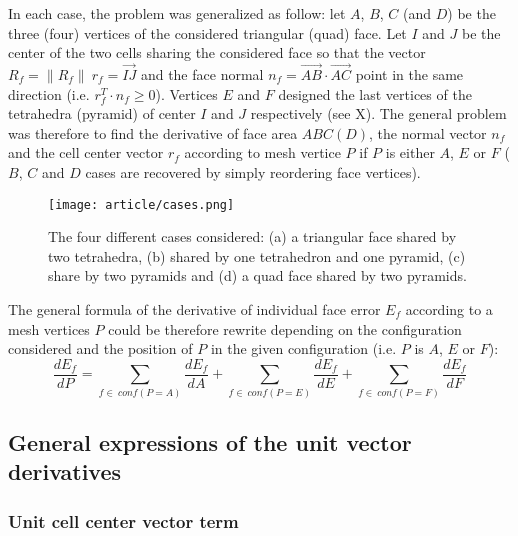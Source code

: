 \documentclass[11pt]{article}
\begin{document}
In each case, the problem was generalized as follow: let $A$, $B$, $C$ (and $D$) be the three (four) vertices of the considered triangular (quad) face. 
Let $I$ and $J$ be the center of the two cells sharing the considered face so that the vector $R_f=\|R_f\|\ r_f = \overrightarrow{IJ}$ and the face normal $n_f = \overrightarrow{AB} \cdot \overrightarrow{AC}$ point in the same direction (i.e. $r_f^T \cdot n_f \geq 0$).
Vertices $E$ and $F$ designed the last vertices of the tetrahedra (pyramid) of center $I$ and $J$ respectively (see X).
The general problem was therefore to find the derivative of face area $ABC(D)$, the normal vector $n_f$ and the cell center vector $r_f$ according to mesh vertice $P$ if $P$ is either $A$, $E$ or $F$ ($B$, $C$ and $D$ cases are recovered by simply reordering face vertices). 

\begin{figure}[h]
  \centering
  \texttt{[image: article/cases.png]}
  \label{cases_figure}
  \caption{The four different cases considered: (a) a triangular face shared by two tetrahedra, (b) shared by one tetrahedron and one pyramid, (c) share by two pyramids and (d) a quad face shared by two pyramids.}
\end{figure}

The general formula of the derivative of individual face error $E_f$ according to a mesh vertices $P$ could be therefore rewrite depending on the configuration considered and the position of $P$ in the given configuration (i.e. $P$ is $A$, $E$ or $F$):
\begin{equation}
\frac{dE_f}{dP} = \sum_{f\in\ conf(P=A)} \frac{dE_f}{dA} + \sum_{f\in\ conf(P=E)} \frac{dE_f}{dE} +
\sum_{f\in\ conf(P=F)} \frac{dE_f}{dF} 
\end{equation}



\subsection{General expressions of the unit vector derivatives}

\subsubsection{Unit cell center vector term}
\end{document}
